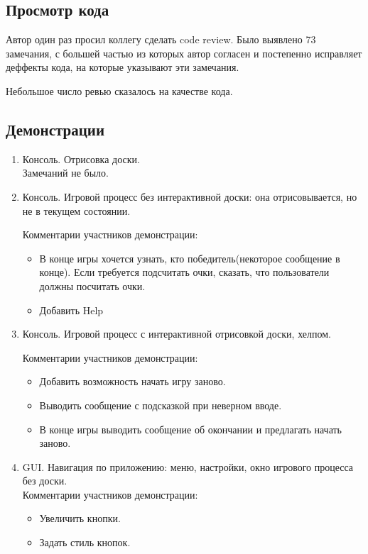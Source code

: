 \subsection*{Просмотр кода}

Автор один раз просил коллегу сделать code review. Было выявлено 73 замечания, с большей частью из которых автор согласен и постепенно исправляет деффекты кода, на которые указывают эти замечания.

Небольшое число ревью сказалось на качестве кода.

\subsection*{Демонстрации}

\begin{enumerate}

\item Консоль. Отрисовка доски.\\
	Замечаний не было.

\item Консоль. Игровой процесс без интерактивной доски: она отрисовывается, но не в текущем состоянии.

Комментарии участников демонстрации:

\begin{itemize}
	\item В конце игры хочется узнать, кто победитель(некоторое сообщение в конце). Если требуется подсчитать очки, сказать, что пользователи должны посчитать очки.
	\item Добавить Help
\end{itemize}

\item Консоль. Игровой процесс с интерактивной отрисовкой доски, хелпом.

Комментарии участников демонстрации:

\begin{itemize}
	\item Добавить возможность начать игру заново.
	\item Выводить сообщение с подсказкой при неверном вводе.
	\item В конце игры выводить сообщение об окончании и предлагать начать заново.
\end{itemize}

\item GUI. Навигация по приложению: меню, настройки, окно игрового процесса без доски.\\

Комментарии участников демонстрации:

\begin{itemize}
	\item Увеличить кнопки.
	\item Задать стиль кнопок. 
\end{itemize}

\end{enumerate}

